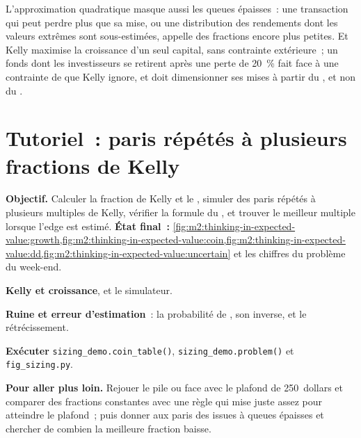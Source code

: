 L'approximation quadratique masque aussi les queues épaisses~: une transaction qui peut perdre plus que
sa mise, ou une distribution des rendements dont les valeurs extrêmes sont sous-estimées, appelle
des fractions encore plus petites. Et Kelly maximise la croissance d'un seul capital, sans
contrainte extérieure~; un fonds dont les investisseurs se retirent après une perte de 20~\% fait
face à une contrainte de  que Kelly ignore, et doit dimensionner ses mises à partir du
, et non du .

\section{Tutoriel~: paris répétés à plusieurs fractions de Kelly}\label{tut:m2:thinking-in-expected-value:sizing}

\begin{tutorial}
\textbf{Objectif.} Calculer la fraction de Kelly et le , simuler des paris
répétés à plusieurs multiples de Kelly, vérifier la formule du , et trouver le
meilleur multiple lorsque l'edge est estimé.
\textbf{État final~:} \cref{fig:m2:thinking-in-expected-value:growth,fig:m2:thinking-in-expected-value:coin,fig:m2:thinking-in-expected-value:dd,fig:m2:thinking-in-expected-value:uncertain}
et les chiffres du problème du week-end.
\begin{tutsteps}
\item \textbf{Kelly et croissance}, et le simulateur.
\label{lst:m2:thinking-in-expected-value:kelly}
\item \textbf{Ruine et erreur d'estimation}~: la probabilité de , son inverse, et le
rétrécissement.
\label{lst:m2:thinking-in-expected-value:ruin}
\item \textbf{Exécuter} \texttt{sizing\_demo.coin\_table()}, \texttt{sizing\_demo.problem()}
et \texttt{fig\_sizing.py}.
\end{tutsteps}
\textbf{Pour aller plus loin.} Rejouer le pile ou face avec le plafond de 250~dollars et comparer des
fractions constantes avec une règle qui mise juste assez pour atteindre le plafond~; puis donner aux
paris des issues à queues épaisses et chercher de combien la meilleure fraction baisse.
\end{tutorial}


